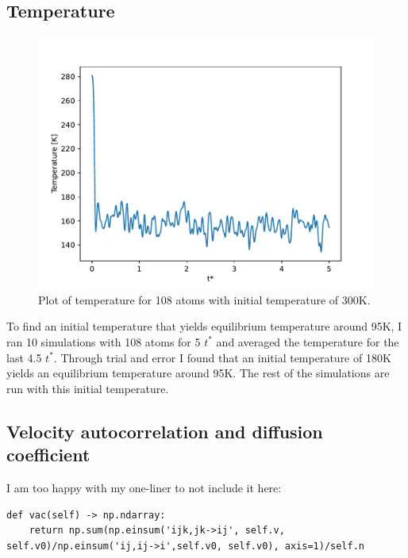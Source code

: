 \documentclass[a4paper,10pt,english]{article}
\begin{document}
\subsection{Temperature} \label{4a}

\begin{figure}[h!]
    \centering
    \includegraphics[scale=0.65]{../figures/4_a_ii.pdf}
    \caption{Plot of temperature for 108 atoms with initial temperature of 300K.}
    \label{fig:temperature1}
\end{figure}

To find an initial temperature that yields equilibrium temperature around 95K, I ran 10 simulations with 108 atoms for 5 $t^*$ and averaged the temperature for the last 4.5 $t^*$. Through trial and error I found that an initial temperature of 180K yields an equilibrium temperature around 95K. The rest of the simulations are run with this initial temperature.

\subsection{Velocity autocorrelation and diffusion coefficient} \label{4b}

I am too happy with my one-liner to not include it here:
\begin{lstlisting}[breaklines=true]
def vac(self) -> np.ndarray:
    return np.sum(np.einsum('ijk,jk->ij', self.v, self.v0)/np.einsum('ij,ij->i',self.v0, self.v0), axis=1)/self.n
\end{lstlisting}
\end{document}
